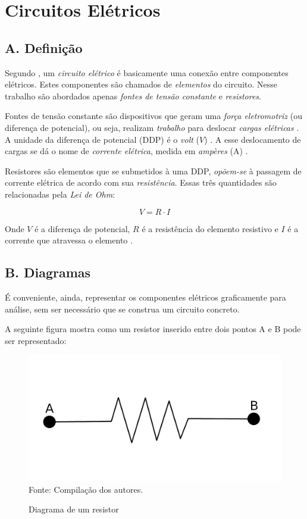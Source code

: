 \documentclass[twocolumn, 10pt]{extarticle}
\begin{document}
\section{Circuitos Elétricos}

\subsection*{A. \quad Definição}

Segundo \cite[p. 4]{sadiku}, um \textit{circuito elétrico} é basicamente uma conexão entre componentes elétricos. Estes componentes são chamados de \textit{elementos} do circuito. Nesse trabalho são abordados apenas \textit{fontes de tensão constante} e \textit{resistores}.

Fontes de tensão constante são dispositivos que geram uma \textit{força eletromotriz} (ou diferença de potencial), ou seja, realizam \textit{trabalho} para deslocar \textit{cargas elétricas} \cite[p. 8]{sadiku}. A unidade da diferença de potencial (DDP) é o \textit{volt} ($V$) \cite[p. 9]{sadiku}. A esse deslocamento de cargas se dá o nome de \textit{corrente elétrica}, medida em \textit{ampères} (A) \cite[p. 6]{sadiku}.

Resistores são elementos que se submetidos à uma DDP, \textit{opõem-se} à passagem de corrente elétrica \cite[p. 28]{sadiku} de acordo com sua \textit{resistência}. Essas três quantidades são relacionadas pela \textit{Lei de Ohm}:

\[
V = R\cdot I
\]

Onde $V$ é a diferença de potencial, $R$ é a resistência do elemento resistivo e $I$ é a corrente que atravessa o elemento \cite[p. 28]{sadiku}.

\subsection*{B. \quad Diagramas}

É conveniente, ainda, representar os componentes elétricos graficamente para análise, sem ser necessário que se construa um circuito concreto.

A seguinte figura mostra como um resistor inserido entre dois pontos A e B pode ser representado:

\begin{figure}[H]
	\caption{Diagrama de um resistor} 
	\centering
	\includegraphics[scale=0.7]{res1}
	\\ Fonte: Compilação dos autores.
\end{figure}
\end{document}

